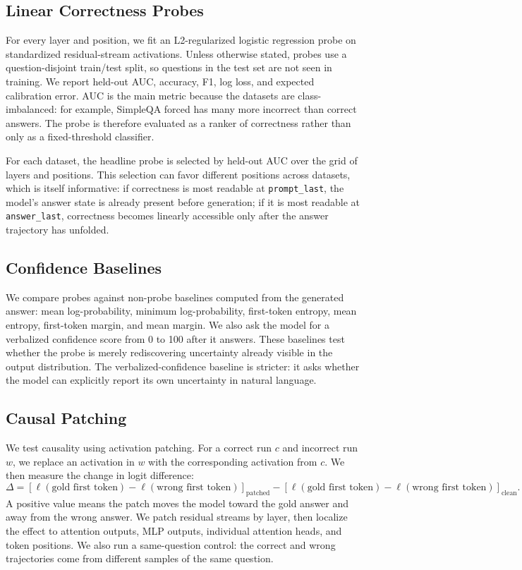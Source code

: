 \documentclass[11pt]{article}
\begin{document}
\subsection{Linear Correctness Probes}

For every layer and position, we fit an L2-regularized logistic regression probe on
standardized residual-stream activations. Unless otherwise stated, probes use a
question-disjoint train/test split, so questions in the test set are not seen in
training. We report held-out AUC, accuracy, F1, log loss, and expected calibration
error. AUC is the main metric because the datasets are class-imbalanced: for
example, SimpleQA forced has many more incorrect than correct answers. The probe is
therefore evaluated as a ranker of correctness rather than only as a fixed-threshold
classifier.

For each dataset, the headline probe is selected by held-out AUC over the grid of
layers and positions. This selection can favor different positions across
datasets, which is itself informative: if correctness is most readable at
\texttt{prompt\_last}, the model's answer state is already present before
generation; if it is most readable at \texttt{answer\_last}, correctness becomes
linearly accessible only after the answer trajectory has unfolded.

\subsection{Confidence Baselines}

We compare probes against non-probe baselines computed from the generated answer:
mean log-probability, minimum log-probability, first-token entropy, mean entropy,
first-token margin, and mean margin. We also ask the model for a verbalized
confidence score from 0 to 100 after it answers. These baselines test whether the
probe is merely rediscovering uncertainty already visible in the output
distribution. The verbalized-confidence baseline is stricter: it asks whether the
model can explicitly report its own uncertainty in natural language.

\subsection{Causal Patching}

We test causality using activation patching. For a correct run $c$ and incorrect
run $w$, we replace an activation in $w$ with the corresponding activation from
$c$. We then measure the change in logit difference:
\[
\Delta = \left[\ell(\text{gold first token}) - \ell(\text{wrong first token})\right]_{\text{patched}}
- \left[\ell(\text{gold first token}) - \ell(\text{wrong first token})\right]_{\text{clean}}.
\]
A positive value means the patch moves the model toward the gold answer and away
from the wrong answer. We patch residual streams by layer, then localize the effect
to attention outputs, MLP outputs, individual attention heads, and token positions.
We also run a same-question control: the correct and wrong trajectories come from
different samples of the same question.
\end{document}
